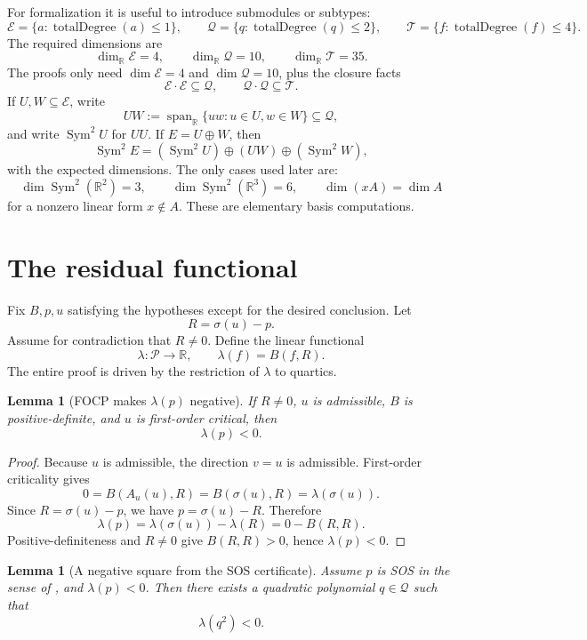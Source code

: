 \documentclass[11pt]{article}
\newtheorem{lemma}[theorem]{Lemma}
\newcommand{\R}{\mathbb R}
\newcommand{\Poly}{\mathcal P}
\newcommand{\Lin}{\mathcal E}
\newcommand{\Quad}{\mathcal Q}
\newcommand{\Quart}{\mathcal T}
\newcommand{\Span}{\operatorname{span}}
\newcommand{\Sym}{\operatorname{Sym}}
\newcommand{\td}{\operatorname{totalDegree}}
\newcommand{\defeq}{\mathrel{:=}}
\newcommand{\lean}[1]{\texttt{\detokenize{#1}}}
\begin{document}
For formalization it is useful to introduce submodules or subtypes:
\[
\Lin=\{a: \td(a)\le 1\},\qquad
\Quad=\{q: \td(q)\le 2\},\qquad
\Quart=\{f: \td(f)\le 4\}.
\]
The required dimensions are
\[
\dim_\R \Lin=4,
\qquad
\dim_\R \Quad=10,
\qquad
\dim_\R \Quart=35.
\]
The proofs only need \(\dim\Lin=4\) and \(\dim\Quad=10\), plus the closure facts
\[
\Lin\cdot\Lin\subseteq\Quad,
\qquad
\Quad\cdot\Quad\subseteq\Quart.
\]
If \(U,W\subseteq\Lin\), write
\[
UW\defeq \Span_\R\{uw:u\in U,w\in W\}\subseteq\Quad,
\]
and write \(\Sym^2 U\) for \(UU\).  If \(E=U\oplus W\), then
\[
\Sym^2 E=(\Sym^2 U)\oplus (UW)\oplus(\Sym^2 W),
\]
with the expected dimensions.  The only cases used later are:
\[
\dim \Sym^2(\R^2)=3,
\qquad
\dim \Sym^2(\R^3)=6,
\qquad
\dim(xA)=\dim A
\]
for a nonzero linear form \(x\notin A\).  These are elementary basis computations.

\section{The residual functional}

Fix \(B,p,u\) satisfying the hypotheses except for the desired conclusion.  Let
\[
R=\sigma(u)-p.
\]
Assume for contradiction that \(R\ne0\).  Define the linear functional
\[
\lambda:\Poly\to\R,
\qquad
\lambda(f)=B(f,R).
\]
The entire proof is driven by the restriction of \(\lambda\) to quartics.

\begin{lemma}[FOCP makes \(\lambda(p)\) negative]\label{lem:lambda-p-negative}
If \(R\ne0\), \(u\) is admissible, \(B\) is positive-definite, and \(u\) is first-order critical, then
\[
\lambda(p)<0.
\]
\end{lemma}

\begin{proof}
Because \(u\) is admissible, the direction \(v=u\) is admissible.  First-order criticality gives
\[
0=B(A_u(u),R)=B(\sigma(u),R)=\lambda(\sigma(u)).
\]
Since \(R=\sigma(u)-p\), we have \(p=\sigma(u)-R\).  Therefore
\[
\lambda(p)=\lambda(\sigma(u))-\lambda(R)=0-B(R,R).
\]
Positive-definiteness and \(R\ne0\) give \(B(R,R)>0\), hence \(\lambda(p)<0\).
\end{proof}

\begin{lemma}[A negative square from the SOS certificate]\label{lem:negative-sos-summand}
Assume \(p\) is SOS in the sense of \lean{IsSOSQuartic}, and \(\lambda(p)<0\).  Then there exists a quadratic polynomial \(q\in\Quad\) such that
\[
\lambda(q^2)<0.
\]
\end{lemma}
\end{document}
